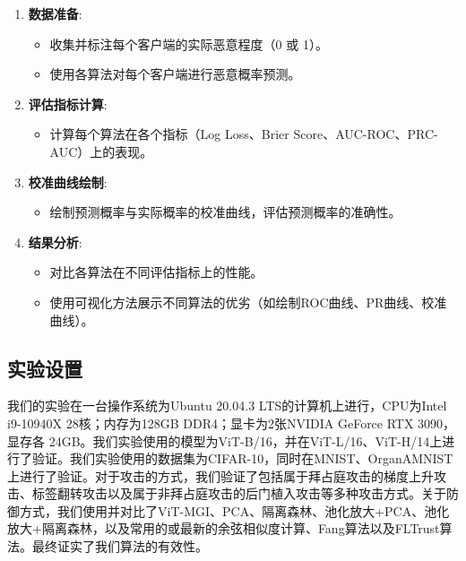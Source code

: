 \documentclass[conference]{IEEEtran}
\begin{document}
\begin{enumerate}
    \item \textbf{数据准备}:
    \begin{itemize}
        \item 收集并标注每个客户端的实际恶意程度（0 或 1）。
        \item 使用各算法对每个客户端进行恶意概率预测。
    \end{itemize}

    \item \textbf{评估指标计算}:
    \begin{itemize}
        \item 计算每个算法在各个指标（Log Loss、Brier Score、AUC-ROC、PRC-AUC）上的表现。
    \end{itemize}

    \item \textbf{校准曲线绘制}:
    \begin{itemize}
        \item 绘制预测概率与实际概率的校准曲线，评估预测概率的准确性。
    \end{itemize}

    \item \textbf{结果分析}:
    \begin{itemize}
        \item 对比各算法在不同评估指标上的性能。
        \item 使用可视化方法展示不同算法的优劣（如绘制ROC曲线、PR曲线、校准曲线）。
    \end{itemize}
\end{enumerate}

\subsection{实验设置}
\label{exp:settings}



我们的实验在一台操作系统为Ubuntu 20.04.3 LTS的计算机上进行，CPU为Intel i9-10940X 28核；内存为128GB DDR4；显卡为2张NVIDIA GeForce RTX 3090，显存各 24GB。我们实验使用的模型为ViT-B/16，并在ViT-L/16、ViT-H/14上进行了验证。我们实验使用的数据集为CIFAR-10，同时在MNIST、OrganAMNIST上进行了验证。对于攻击的方式，我们验证了包括属于拜占庭攻击的梯度上升攻击、标签翻转攻击以及属于非拜占庭攻击的后门植入攻击等多种攻击方式。关于防御方式，我们使用并对比了ViT-MGI、PCA、隔离森林、池化放大\cite{betterTogether}+PCA、池化放大+隔离森林，以及常用的或最新的余弦相似度计算、Fang算法以及FLTrust算法。最终证实了我们算法的有效性。
\end{document}
